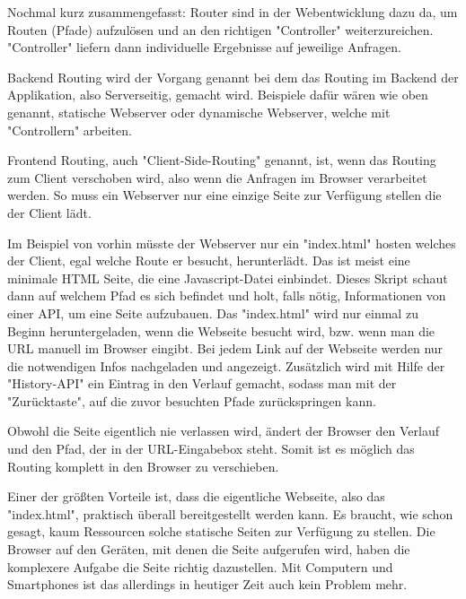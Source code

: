 Nochmal kurz zusammengefasst: Router sind in der Webentwicklung dazu da, um Routen (Pfade) aufzulösen und an den richtigen "Controller" weiterzureichen. "Controller" liefern dann individuelle Ergebnisse auf jeweilige Anfragen.


Backend Routing wird der Vorgang genannt bei dem das Routing im Backend der Applikation, also Serverseitig, gemacht wird. Beispiele dafür wären wie oben genannt, statische Webserver oder dynamische Webserver, welche mit "Controllern" arbeiten.


Frontend Routing, auch "Client-Side-Routing" genannt, ist, wenn das Routing zum Client verschoben wird, also wenn die Anfragen im Browser verarbeitet werden. So muss ein Webserver nur eine einzige Seite zur Verfügung stellen die der Client lädt.

Im Beispiel von vorhin müsste der Webserver nur ein "{\ttfamily index.html}" hosten welches der Client, egal welche Route er besucht, herunterlädt. Das ist meist eine minimale HTML Seite, die eine Javascript-Datei einbindet. Dieses Skript schaut dann auf welchem Pfad es sich befindet und holt, falls nötig, Informationen von einer API, um eine Seite aufzubauen. Das "{\ttfamily index.html}" wird nur einmal zu Beginn heruntergeladen, wenn die Webseite besucht wird, bzw. wenn man die URL manuell im Browser eingibt. Bei jedem Link auf der Webseite werden nur die notwendigen Infos nachgeladen und angezeigt. Zusätzlich wird mit Hilfe der "History-API" ein Eintrag in den Verlauf gemacht, sodass man mit der "Zurücktaste", auf die zuvor besuchten Pfade zurückspringen kann.

Obwohl die Seite eigentlich nie verlassen wird, ändert der Browser den Verlauf und den Pfad, der in der URL-Eingabebox steht. Somit ist es möglich das Routing komplett in den Browser zu verschieben.


Einer der größten Vorteile ist, dass die eigentliche Webseite, also das "{\ttfamily index.html}", praktisch überall bereitgestellt werden kann. Es braucht, wie schon gesagt, kaum Ressourcen solche statische Seiten zur Verfügung zu stellen. Die Browser auf den Geräten, mit denen die Seite aufgerufen wird, haben die komplexere Aufgabe die Seite richtig dazustellen. Mit Computern und Smartphones ist das allerdings in heutiger Zeit auch kein Problem mehr.


